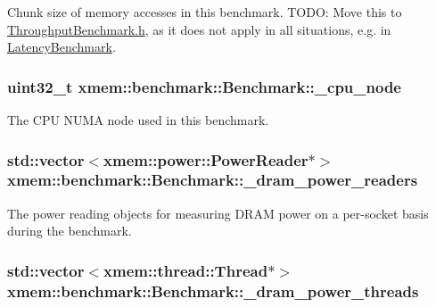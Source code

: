 Chunk size of memory accesses in this benchmark. T\-O\-D\-O\-: Move this to \hyperlink{_throughput_benchmark_8h}{Throughput\-Benchmark.\-h}, as it does not apply in all situations, e.\-g. in \hyperlink{classxmem_1_1benchmark_1_1_latency_benchmark}{Latency\-Benchmark}. \hypertarget{classxmem_1_1benchmark_1_1_benchmark_ab840cb1f53439eeeb6bdce7cd1eed78b}{
\subsubsection[{\-\_\-cpu\-\_\-node}]{\setlength{\rightskip}{0pt plus 5cm}uint32\-\_\-t xmem\-::benchmark\-::\-Benchmark\-::\-\_\-cpu\-\_\-node\hspace{0.3cm}{\ttfamily [protected]}}}\label{classxmem_1_1benchmark_1_1_benchmark_ab840cb1f53439eeeb6bdce7cd1eed78b}
The C\-P\-U N\-U\-M\-A node used in this benchmark. \hypertarget{classxmem_1_1benchmark_1_1_benchmark_a6d4445364d9b6f17ec78be6c8cf253f1}{
\subsubsection[{\-\_\-dram\-\_\-power\-\_\-readers}]{\setlength{\rightskip}{0pt plus 5cm}std\-::vector$<${\bf xmem\-::power\-::\-Power\-Reader}$\ast$$>$ xmem\-::benchmark\-::\-Benchmark\-::\-\_\-dram\-\_\-power\-\_\-readers\hspace{0.3cm}{\ttfamily [protected]}}}\label{classxmem_1_1benchmark_1_1_benchmark_a6d4445364d9b6f17ec78be6c8cf253f1}
The power reading objects for measuring D\-R\-A\-M power on a per-\/socket basis during the benchmark. \hypertarget{classxmem_1_1benchmark_1_1_benchmark_a7aa95682a12f8fe4262b1fffb088d6ac}{
\subsubsection[{\-\_\-dram\-\_\-power\-\_\-threads}]{\setlength{\rightskip}{0pt plus 5cm}std\-::vector$<${\bf xmem\-::thread\-::\-Thread}$\ast$$>$ xmem\-::benchmark\-::\-Benchmark\-::\-\_\-dram\-\_\-power\-\_\-threads\hspace{0.3cm}{\ttfamily [protected]}}}\label{classxmem_1_1benchmark_1_1_benchmark_a7aa95682a12f8fe4262b1fffb088d6ac}
